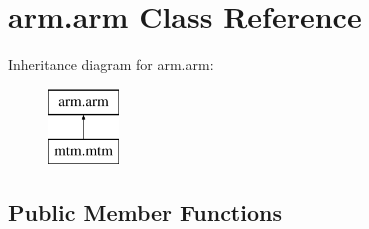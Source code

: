 \hypertarget{classarm_1_1arm}{\section{arm.\-arm Class Reference}
\label{classarm_1_1arm}
}
Inheritance diagram for arm.\-arm\-:\begin{figure}[H]
\begin{center}
\leavevmode
\includegraphics[height=2.000000cm]{classarm_1_1arm}
\end{center}
\end{figure}
\subsection*{Public Member Functions}
